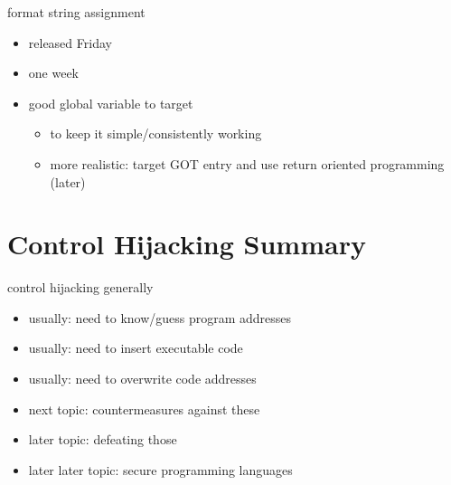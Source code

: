 \begin{frame}{format string assignment}
    \begin{itemize}
        \item released Friday
        \item one week
        \item good global variable to target
            \begin{itemize}
                \item to keep it simple/consistently working
                \item more realistic: target GOT entry and use return oriented programming (later)
            \end{itemize}
    \end{itemize}
\end{frame}

\section{Control Hijacking Summary}


\begin{frame}{control hijacking generally}
    \begin{itemize}
    \item usually: need to know/guess program addresses
    \item usually: need to insert executable code
    \item usually: need to overwrite code addresses
    \vspace{.5cm}
    \item next topic: countermeasures against these
    \item later topic: defeating those
    \item later later topic: secure programming languages
    \end{itemize}
\end{frame}

